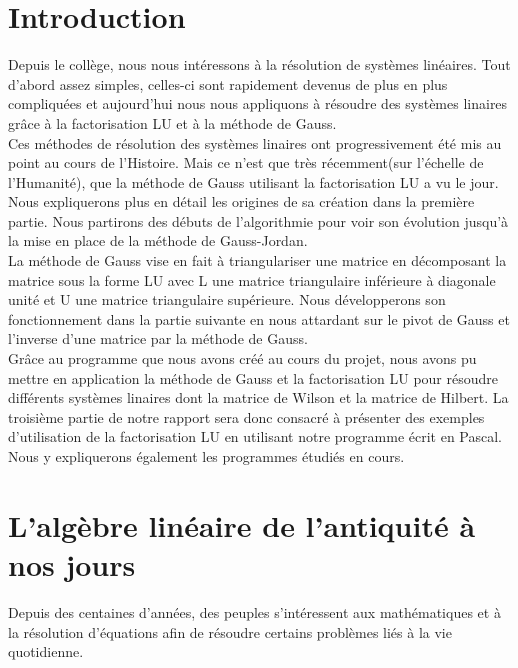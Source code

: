 \documentclass[a4paper,12pt]{report}
\title{}
\date{}
\begin{document}

\tableofcontents

\newpage

\chapter*{Introduction}


Depuis le collège, nous nous intéressons à la résolution de systèmes linéaires. Tout d'abord assez simples, celles-ci sont rapidement devenus de plus en plus compliquées et aujourd’hui nous nous appliquons à résoudre des systèmes linaires grâce à la factorisation LU et à la méthode de Gauss.\\

Ces méthodes de résolution des systèmes linaires ont progressivement été mis au point au cours de l'Histoire. Mais ce n'est que très récemment(sur l'échelle de l'Humanité), que la méthode de Gauss utilisant la factorisation LU a vu le jour. Nous expliquerons plus en détail les origines de sa création dans la première partie. Nous partirons des débuts de l'algorithmie pour voir son évolution jusqu'à la mise en place de la méthode de Gauss-Jordan.\\

La méthode de Gauss vise en fait à triangulariser une matrice en décomposant la matrice sous la forme LU avec L une matrice triangulaire inférieure à diagonale unité et U une matrice triangulaire supérieure. Nous développerons son fonctionnement dans la partie suivante en nous attardant sur le pivot de Gauss et l'inverse d'une matrice par la méthode de Gauss.\\

Grâce au programme que nous avons créé au cours du projet, nous avons pu mettre en application la méthode de Gauss et la factorisation LU pour résoudre différents systèmes linaires dont la matrice de Wilson et la matrice de Hilbert. La troisième partie de notre rapport sera donc consacré à présenter des exemples d'utilisation de la factorisation LU en utilisant notre programme écrit en Pascal. Nous y expliquerons également les programmes étudiés en cours.\\
\newpage

\chapter{L’algèbre linéaire de l’antiquité à nos jours}

Depuis des centaines d’années, des peuples s’intéressent aux mathématiques et à la résolution d’équations afin de résoudre certains problèmes liés à la vie quotidienne.\\
\end{document}

